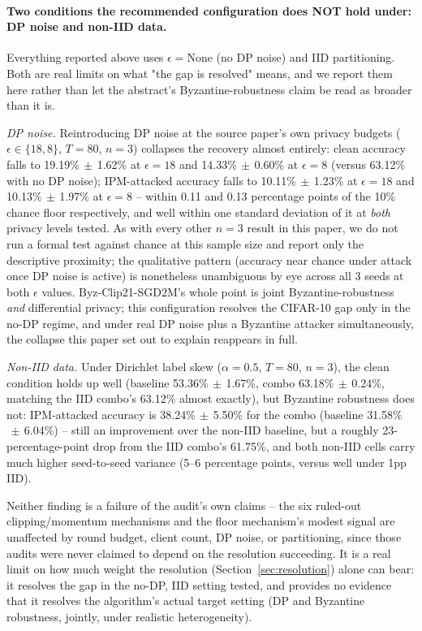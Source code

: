 \documentclass{article}
\begin{document}
\paragraph{Two conditions the recommended configuration does NOT hold under:
DP noise and non-IID data.} Everything reported above uses $\epsilon{=}\mathrm{None}$
(no DP noise) and IID partitioning. Both are real limits on what "the gap is
resolved" means, and we report them here rather than let the abstract's
Byzantine-robustness claim be read as broader than it is.

\emph{DP noise.} Reintroducing DP noise at the source paper's own privacy
budgets ($\epsilon \in \{18, 8\}$, $T{=}80$, $n{=}3$) collapses the recovery
almost entirely: clean accuracy falls to 19.19\%$\,\pm\,$1.62\% at
$\epsilon{=}18$ and 14.33\%$\,\pm\,$0.60\% at $\epsilon{=}8$ (versus 63.12\%
with no DP noise); IPM-attacked accuracy falls to 10.11\%$\,\pm\,$1.23\% at
$\epsilon{=}18$ and 10.13\%$\,\pm\,$1.97\% at $\epsilon{=}8$ -- within
0.11 and 0.13 percentage points of the 10\% chance floor respectively, and
well within one standard deviation of it at \emph{both} privacy levels
tested. As with every other $n{=}3$ result in this paper, we do not run a
formal test against chance at this sample size and report only the
descriptive proximity; the qualitative pattern (accuracy near chance under
attack once DP noise is active) is nonetheless unambiguous by eye across all
3 seeds at both $\epsilon$ values. Byz-Clip21-SGD2M's whole point is joint Byzantine-robustness
\emph{and} differential privacy; this configuration resolves the CIFAR-10 gap
only in the no-DP regime, and under real DP noise plus a Byzantine attacker
simultaneously, the collapse this paper set out to explain reappears in full.

\emph{Non-IID data.} Under Dirichlet label skew ($\alpha{=}0.5$, $T{=}80$,
$n{=}3$), the clean condition holds up well (baseline 53.36\%$\,\pm\,$1.67\%,
combo 63.18\%$\,\pm\,$0.24\%, matching the IID combo's 63.12\% almost exactly),
but Byzantine robustness does not: IPM-attacked accuracy is
38.24\%$\,\pm\,$5.50\% for the combo (baseline 31.58\%$\,\pm\,$6.04\%) --
still an improvement over the non-IID baseline, but a roughly 23-percentage-point
drop from the IID combo's 61.75\%, and both non-IID cells carry much higher
seed-to-seed variance (5--6 percentage points, versus well under 1pp IID).

Neither finding is a failure of the audit's own claims -- the six ruled-out
clipping/momentum mechanisms and the floor mechanism's modest signal are
unaffected by round budget, client count, DP noise, or partitioning, since
those audits were never claimed to depend on the resolution succeeding. It is
a real limit on how much weight the resolution (Section~\ref{sec:resolution})
alone can bear: it resolves the gap in the no-DP, IID setting tested, and
provides no evidence that it resolves the algorithm's actual target setting
(DP and Byzantine robustness, jointly, under realistic heterogeneity).
\end{document}
